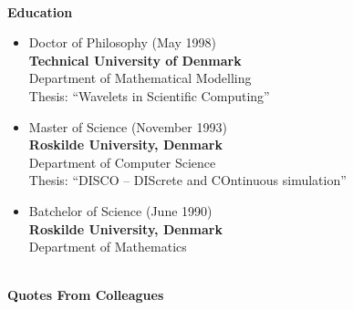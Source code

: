 \documentclass[11pt,a4paper]{article}
\begin{document}
\pagebreak
\begin{center}
  \hrulefill \\
  {\bf Education} \\[-0.2cm]
  \hrulefill
\end{center}

\begin{itemize}
\item Doctor of Philosophy (May 1998) \\
{\bf Technical University of Denmark} \\
Department of Mathematical Modelling  \\
Thesis: ``Wavelets in Scientific Computing''\\

\item  Master of Science (November 1993) \\
{\bf Roskilde University, Denmark} \\
Department of Computer Science \\
Thesis: ``DISCO -- DIScrete and COntinuous simulation''\\

\item  Batchelor of Science (June 1990) \\
{\bf Roskilde University, Denmark} \\
Department of Mathematics \\
\end{itemize}

\begin{center}
  \hrulefill \\
  {\bf Quotes From Colleagues} \\[-0.2cm]
  \hrulefill
\end{center}
\end{document}
